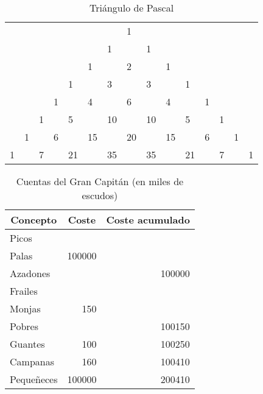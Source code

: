\documentclass{article}
\begin{document}
\begin{table}[]
\centering
\begin{tabular}{lllllllllllllll}
 &  &  &  &  &  &  & 1 &  &  &  &  &  &  &  \\
 &  &  &  &  &  & 1 &  & 1 &  &  &  &  &  &  \\
 &  &  &  &  & 1 &  & 2 &  & 1 &  &  &  &  &  \\
 &  &  &  & 1 &  & 3 &  & 3 &  & 1 &  &  &  &  \\
 &  &  & 1 &  & 4 &  & 6 &  & 4 &  & 1 &  &  &  \\
 &  & 1 &  & 5 &  & 10 &  & 10 &  & 5 &  & 1 &  &  \\
 & 1 &  & 6 &  & 15 &  & 20 &  & 15 &  & 6 &  & 1 &  \\
1 &  & 7 &  & 21 &  & 35 &  & 35 &  & 21 &  & 7 &  & 1
\end{tabular}
\caption{Triángulo de Pascal}
\label{tab:pascal}
\end{table}



\begin{table}[]
\centering
\begin{tabular}{|l|r|r|}
\hline
\multicolumn{1}{|c|}{\textbf{Concepto}} & \multicolumn{1}{c|}{\textbf{Coste}} & \multicolumn{1}{c|}{\textbf{Coste acumulado}} \\ \hline
Picos &  &  \\ \cline{3-3} 
Palas & 100000 &  \\ \cline{3-3} 
Azadones &  & 100000 \\ \hline
Frailes &  &  \\ \cline{3-3} 
Monjas & 150 &  \\ \cline{3-3} 
Pobres &  & 100150 \\ \hline
Guantes & 100 & 100250 \\ \hline
Campanas & 160 & 100410 \\ \hline
Pequeñeces & 100000 & 200410 \\ \hline
\end{tabular}
\caption{Cuentas del Gran Capitán (en miles de escudos)}
\label{tab:gcap}
\end{table}
\end{document}
